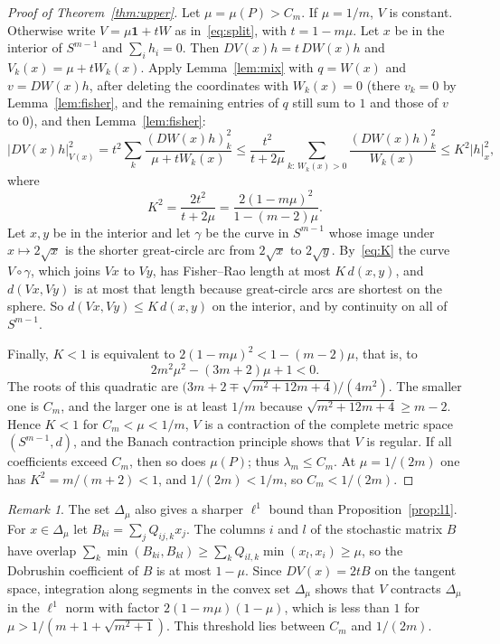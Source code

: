 \documentclass[11pt]{amsart}
\theoremstyle{definition}
\theoremstyle{remark}
\newtheorem{remark}[theorem]{Remark}
\newcommand{\one}{\mathbf{1}}
\begin{document}
\begin{proof}[Proof of Theorem~\ref{thm:upper}]
Let $\mu=\mu(P)>C_m$. If $\mu=1/m$, $V$ is constant. Otherwise write $V=\mu\one+tW$ as in~\eqref{eq:split}, with
$t=1-m\mu$. Let $x$ be in the interior of $S^{m-1}$ and $\sum_ih_i=0$. Then $DV(x)h=t\,DW(x)h$ and $V_k(x)=\mu+tW_k(x)$.
Apply Lemma~\ref{lem:mix} with $q=W(x)$ and $v=DW(x)h$, after deleting the coordinates with $W_k(x)=0$ (there $v_k=0$
by Lemma~\ref{lem:fisher}, and the remaining entries of $q$ still sum to $1$ and those of $v$ to $0$), and then
Lemma~\ref{lem:fisher}:
\begin{equation}\label{eq:K}
|DV(x)h|_{V(x)}^2=t^2\sum_k\frac{(DW(x)h)_k^2}{\mu+tW_k(x)}\le\frac{t^2}{t+2\mu}\sum_{k:\,W_k(x)>0}\frac{(DW(x)h)_k^2}{W_k(x)}\le K^2|h|_x^2,
\end{equation}
where
\[
K^2=\frac{2t^2}{t+2\mu}=\frac{2(1-m\mu)^2}{1-(m-2)\mu}.
\]
Let $x,y$ be in the interior and let $\gamma$ be the curve in $S^{m-1}$ whose image under $x\mapsto2\sqrt x$ is the
shorter great-circle arc from $2\sqrt x$ to $2\sqrt y$. By~\eqref{eq:K} the curve $V\circ\gamma$, which joins $Vx$ to
$Vy$, has Fisher--Rao length at most $K\,d(x,y)$, and $d(Vx,Vy)$ is at most that length because great-circle arcs are
shortest on the sphere. So $d(Vx,Vy)\le K\,d(x,y)$ on the interior, and by continuity on all of $S^{m-1}$.

Finally, $K<1$ is equivalent to $2(1-m\mu)^2<1-(m-2)\mu$, that is, to
\[
2m^2\mu^2-(3m+2)\mu+1<0 .
\]
The roots of this quadratic are $\bigl(3m+2\mp\sqrt{m^2+12m+4}\bigr)/(4m^2)$. The smaller one is $C_m$, and the larger
one is at least $1/m$ because $\sqrt{m^2+12m+4}\ge m-2$. Hence $K<1$ for $C_m<\mu<1/m$, $V$ is a contraction of the
complete metric space $(S^{m-1},d)$, and the Banach contraction principle shows that $V$ is regular. If all coefficients
exceed $C_m$, then so does $\mu(P)$; thus $\lambda_m\le C_m$. At $\mu=1/(2m)$ one has $K^2=m/(m+2)<1$, and
$1/(2m)<1/m$, so $C_m<1/(2m)$.
\end{proof}

\begin{remark}\label{rem:l1}
The set $\Delta_\mu$ also gives a sharper $\ell^1$ bound than Proposition~\ref{prop:l1}. For $x\in\Delta_\mu$ let
$B_{ki}=\sum_jQ_{ij,k}x_j$. The columns $i$ and $l$ of the stochastic matrix $B$ have overlap
$\sum_k\min(B_{ki},B_{kl})\ge\sum_kQ_{il,k}\min(x_l,x_i)\ge\mu$, so the Dobrushin coefficient of $B$ is at most $1-\mu$.
Since $DV(x)=2tB$ on the tangent space, integration along segments in the convex set $\Delta_\mu$ shows that $V$ contracts $\Delta_\mu$ in the
$\ell^1$ norm with factor $2(1-m\mu)(1-\mu)$, which is less than $1$ for $\mu>1/(m+1+\sqrt{m^2+1})$. This threshold
lies between $C_m$ and $1/(2m)$.
\end{remark}
\end{document}
